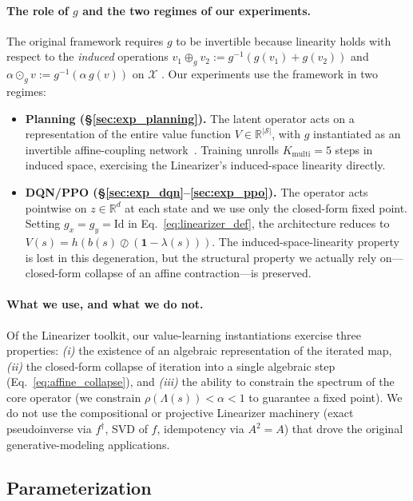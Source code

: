 \documentclass{article}
\newcommand{\R}{\mathbb{R}}
\newcommand{\spb}{\alpha}                    %
\newcommand{\eigs}{\lambda}                  %
\begin{document}
\paragraph{The role of $g$ and the two regimes of our experiments.}
The original framework requires $g$ to be invertible because linearity holds
with respect to the \emph{induced} operations
$v_1 \oplus_g v_2 := g^{-1}(g(v_1)+g(v_2))$ and
$\alpha \odot_g v := g^{-1}(\alpha\, g(v))$ on $\mathcal{X}$
\citep[Lemma~2]{anonymous2026linearizer}. Our experiments use the framework in
two regimes:
\begin{itemize}
  \item \textbf{Planning (\S\ref{sec:exp_planning}).} The latent operator acts on
  a representation of the entire value function $V \in \R^{|\mathcal{S}|}$, with
  $g$ instantiated as an invertible affine-coupling network~\citep{dinh2017density}.
  Training unrolls $K_\text{multi}\!=\!5$ steps in induced space, exercising the
  Linearizer's induced-space linearity directly.
  \item \textbf{DQN/PPO (\S\ref{sec:exp_dqn}--\ref{sec:exp_ppo}).} The operator
  acts pointwise on $z \in \R^d$ at each state and we use only the closed-form
  fixed point. Setting $g_x = g_y = \mathrm{Id}$ in
  Eq.~\eqref{eq:linearizer_def}, the architecture reduces to
  $V(s) = h(b(s) \oslash (\mathbf{1}-\eigs(s)))$. The induced-space-linearity
  property is lost in this degeneration, but the structural property we actually
  rely on---closed-form collapse of an affine contraction---is preserved.
\end{itemize}

\paragraph{What we use, and what we do not.}
Of the Linearizer toolkit, our value-learning instantiations exercise three
properties: \emph{(i)} the existence of an algebraic representation of the
iterated map, \emph{(ii)} the closed-form collapse of iteration into a single
algebraic step (Eq.~\eqref{eq:affine_collapse}), and \emph{(iii)} the ability
to constrain the spectrum of the core operator (we constrain
$\rho(\Lambda(s)) < \spb < 1$ to guarantee a fixed point). We do not use the
compositional or projective Linearizer machinery (exact pseudoinverse via
$f^{\dagger}$, SVD of $f$, idempotency via $A^2=A$) that drove the original
generative-modeling applications.

\subsection{Parameterization}
\label{sec:param}
\end{document}
